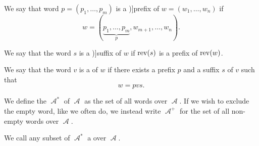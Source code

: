 \begin{definition}
\begin{thmenum}
    \mimprovised We say that word \( p = (p_1, \ldots, p_m) \) is a \term[ru=начало (\cite[20]{Гладкий1973Языки})]{prefix} of \( w = (w_1, \ldots, w_n) \) if
    \begin{equation*}
      w = (\underbrace{p_1, \ldots, p_m}_p, w_{m+1}, \ldots, w_n).
    \end{equation*}

    \mimprovised We say that the word \( s \) is a \term[ru=конец (\cite[20]{Гладкий1973Языки})]{suffix} of \( w \) if \( \operatorname{rev}(s) \) is a prefix of \( \operatorname{rev}(w) \).

     We say that the word \( v \) is a  of \( w \) if there exists a prefix \( p \) and a suffix \( s \) of \( v \) such that
    \begin{equation*}
      w = p v s.
    \end{equation*}

     We define the  \( \mscrA^* \) of \( \mscrA \) as the set of all words over \( \mscrA \). If we wish to exclude the empty word, like we often do, we instead write \( \mscrA^+ \) for the set of all non-empty words over \( \mscrA \).

     We call any subset of \( \mscrA^* \) a  over \( \mscrA \).
  \end{thmenum}
\end{definition}

